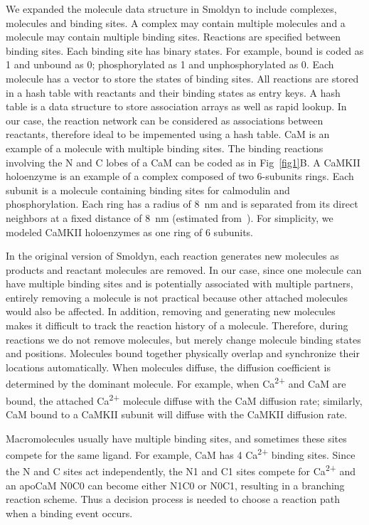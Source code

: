 \documentclass[10pt,letterpaper]{article}
\begin{document}
We expanded the molecule data structure in Smoldyn to include complexes, molecules and binding sites. A complex may contain multiple molecules and a molecule may contain multiple binding sites. Reactions are specified between binding sites. Each binding site has binary states. For example, bound is coded as 1 and unbound as 0; phosphorylated as 1 and unphosphorylated as 0. Each molecule has a vector to store the states of binding sites. All reactions are stored in a hash table with reactants and their binding states as entry keys. A hash table is a data structure to store association arrays as well as rapid lookup. In our case, the reaction network can be considered as associations between reactants, therefore ideal to be impemented using a hash table.
CaM is an example of a molecule with multiple binding sites. The binding reactions involving the N and C lobes of a CaM can be coded as in Fig~\ref{fig1}B. A CaMKII holoenzyme is an example of a complex composed of two 6-subunits rings. Each subunit is a molecule containing binding sites for calmodulin and phosphorylation. Each ring has a radius of \SI{8}{\nm} and is separated from its direct neighbors at a fixed distance of \SI{8}{\nm} (estimated from~\cite{Gaertner:2004jk}). For simplicity, we modeled CaMKII holoenzymes as one ring of 6 subunits.

In the original version of Smoldyn, each reaction generates new molecules as products and reactant molecules are removed. In our case, since one molecule can have multiple binding sites and is potentially associated with multiple partners, entirely removing a molecule is not practical because other attached molecules would also be affected. In addition, removing and generating new molecules makes it difficult to track the reaction history of a molecule. Therefore, during reactions we do not remove molecules, but merely change molecule binding states and positions. Molecules bound together physically overlap and synchronize their locations automatically. When molecules diffuse, the diffusion coefficient is determined by the dominant molecule. For example, when Ca\textsuperscript{2+} and CaM are bound, the attached Ca\textsuperscript{2+} molecule diffuse with the CaM diffusion rate; similarly, CaM bound to a CaMKII subunit will diffuse with the CaMKII diffusion rate.

Macromolecules usually have multiple binding sites, and sometimes these sites compete for the same ligand. For example, CaM has 4 Ca\textsuperscript{2+} binding sites. Since the N and C sites act independently, the N1 and C1 sites compete for Ca\textsuperscript{2+} and an apoCaM N0C0 can become either N1C0 or N0C1, resulting in a branching reaction scheme. Thus a decision process is needed to choose a reaction path when a binding event occurs. 
\end{document}
